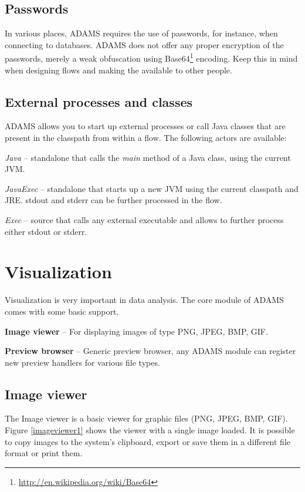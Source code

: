 \newpage
\section{Passwords}
In various places, ADAMS requires the use of passwords, for instance, when
connecting to databases. ADAMS does not offer any proper encryption of the 
passwords, merely a weak obfuscation using 
Base64\footnote{\url{http://en.wikipedia.org/wiki/Base64}{}} encoding. Keep 
this in mind when designing flows and making the available to other people.


\newpage
\section{External processes and classes}
ADAMS allows you to start up external processes or call Java classes that
are present in the classpath from within a flow. The following actors are 
available:
\begin{tight_itemize}
	\item \textit{Java} -- standalone that calls the \textit{main} method of a 
	Java class, using the current JVM.
	\item \textit{JavaExec} -- standalone that starts up a new JVM using
	the current classpath and JRE. stdout and stderr can be further processed
	in the flow.
	\item \textit{Exec} -- source that calls any external executable and allows
	to further process either stdout or stderr.
\end{tight_itemize}


\chapter{Visualization}
Visualization is very important in data analysis. The core module of ADAMS
comes with some basic support.
\begin{tight_itemize}
	\item \textbf{Image viewer} -- For displaying images of type PNG, JPEG, BMP,
	GIF.
	\item \textbf{Preview browser} -- Generic preview browser, any ADAMS module can
	register new preview handlers for various file types.
\end{tight_itemize}

\section{Image viewer}
The Image viewer is a basic viewer for graphic files (PNG, JPEG, BMP, GIF).
Figure \ref{imageviewer1} shows the viewer with a single image loaded. It is
possible to copy images to the system's clipboard, export or save them in a
different file format or print them.

